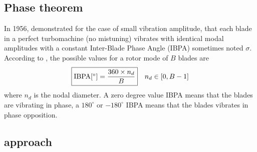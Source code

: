 \subsection{Phase theorem}
\label{sub:lane_theorem}

In 1956, \citet{Lane1956} 
demonstrated for the case of small vibration amplitude,
that each blade in a perfect turbomachine (no mistuning) vibrates with
identical modal amplitudes with a constant Inter-Blade
Phase Angle (IBPA) sometimes noted $\sigma$. 
According to \citet{Lane1956}, the possible values 
for a rotor mode of $B$ blades are
\begin{equation}
    \fbox{$\textrm{IBPA} [^\circ] = \displaystyle \frac{360 \times n_d}{B}$} \quad n_d \in [0, B-1]
\end{equation}
where $n_d$ is the nodal diameter.
A zero degree value IBPA means that the blades are vibrating in phase, a $180^\circ$ or
$-180^\circ$ IBPA means that the blades vibrates in phase opposition.

\subsection{ approach}
\label{sub:weak_coupling_approach}

